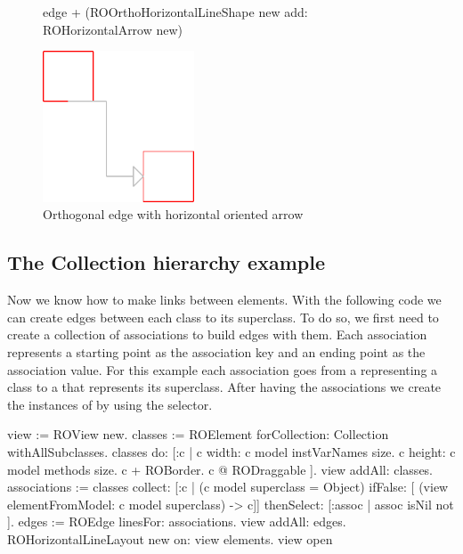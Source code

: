 \documentclass[a4paper,10pt,twoside]{book}
\begin{document}
\begin{figure}[H]
      \begin{minipage}[t]{0.5\textwidth}
      \vspace{0pt}
     \begin{code}{}
edge + (ROOrthoHorizontalLineShape new add: ROHorizontalArrow new)\end{code}
   \end{minipage}
   \hfill
   \begin{minipage}[t]{0.4\textwidth}
      \vspace{0pt} \raggedright
       \centering
		\includegraphics[width=0.4\textwidth]{orthoEdge}
   \end{minipage}
\caption{Orthogonal edge with horizontal oriented arrow}
\label{fig:orthoEdge}
\end{figure} 

\subsection*{The Collection hierarchy example}
Now we know how to make links between elements. With the following code we can create edges between each class to its superclass. To do so, we first need to create a collection of associations to build edges with them. Each association represents a starting point as the association key and an ending point as the association value. For this example each association goes from a  representing a class to a  that represents its superclass. After having the associations we create the instances of  by using the  selector.

\begin{code}{}
view := ROView new.
classes := ROElement forCollection: Collection withAllSubclasses.
classes do: [:c | 
	c width: c model instVarNames size.
	c height: c model methods size.
	c + ROBorder. 
	c @ RODraggable ].
view addAll: classes.
associations := classes 
					collect: [:c | 	(c model superclass = Object)
										ifFalse: [ (view elementFromModel: c model superclass) -> c]]
					thenSelect: [:assoc | assoc isNil not ].
edges := ROEdge linesFor: associations.
view addAll: edges.
ROHorizontalLineLayout new on: view elements.
view open
\end{code}
\end{document}
